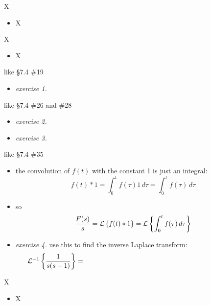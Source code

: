 \documentclass[urlcolor=blue,dvipsnames]{beamer}
\begin{document}
\begin{frame}{X}

\begin{itemize}
\item X
\end{itemize}
\end{frame}


\begin{frame}{X}

\begin{itemize}
\item X
\end{itemize}
\end{frame}


\begin{frame}{like \S7.4 \#19}

\begin{itemize}
\item \emph{exercise 1.}  
\end{itemize}
\end{frame}


\begin{frame}{like \S7.4 \#26 and \#28}

\begin{itemize}
\item \emph{exercise 2.}  
\item \emph{exercise 3.}  
\end{itemize}
\end{frame}


\begin{frame}{like \S7.4 \#35}

\begin{itemize}
\item the convolution of $f(t)$ with the constant 1 is just an integral:
    $$f(t) \ast 1 = \int_0^t f(\tau) 1\,d\tau = \int_0^t f(\tau)\,d\tau$$
\item so
    $$\frac{F(s)}{s} = \mathcal{L}\left\{f(t)\ast 1\right\}=\mathcal{L}\left\{\int_0^t f(\tau)\,d\tau\right\}$$
\item \emph{exercise 4.}  use this to find the inverse Laplace transform:
    $$\LLi{\frac{1}{s(s-1)}} = \hspace{80mm}$$

\vspace{20mm}
\end{itemize}
\end{frame}


\begin{frame}{X}

\begin{itemize}
\item X
\end{itemize}
\end{frame}
\end{document}
